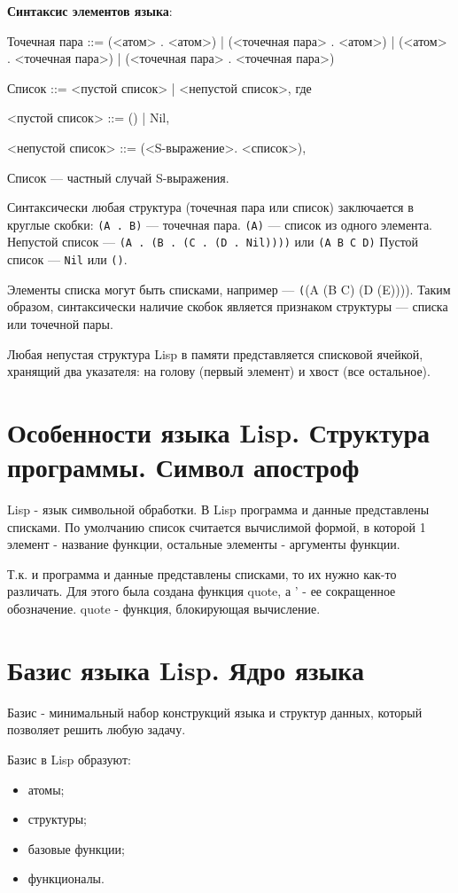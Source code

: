 \textbf{Синтаксис элементов языка}:
\vspace{5mm}


Точечная пара ::= (<атом> . <атом>) | (<точечная пара> . <атом>) | (<атом> . <точечная пара>) | (<точечная пара> . <точечная пара>)

Список ::= <пустой список> | <непустой список>, где 

<пустой список> ::= () | Nil,

<непустой список> ::= (<S-выражение>. <список>),

\vspace{5mm}


Список --- частный случай S-выражения.

Синтаксически любая структура (точечная пара или список) заключается в круглые скобки:
\texttt{(A . B)} --- точечная пара.
\texttt{(A)} --- список из одного элемента.
Непустой список --- \texttt{(A . (B . (C . (D . Nil))))} или \texttt{(A B C D)}
Пустой список --- \texttt{Nil} или \texttt{()}.

Элементы списка могут быть списками, например --- \texttt((A (B C) (D (E)))). Таким образом, синтаксически наличие скобок является признаком структуры --- списка или точечной пары.

Любая непустая структура Lisp в памяти представляется  списковой ячейкой, хранящий два указателя: на голову (первый элемент) и хвост (все остальное).

\section*{Особенности языка Lisp. Структура программы. Символ апостроф}
Lisp - язык символьной обработки. 
В Lisp программа и данные представлены списками.
По умолчанию список считается вычислимой формой, в которой 1 элемент - название функции, остальные элементы - аргументы функции.

Т.к. и программа и данные представлены списками, то их нужно как-то различать. 
Для этого была создана функция quote, а ' - ее сокращенное обозначение. 
quote - функция, блокирующая вычисление.


\section*{Базис языка Lisp. Ядро языка}
Базис - минимальный набор конструкций языка и структур данных, который позволяет решить любую задачу.

Базис в Lisp образуют:
\begin{itemize}
	\item атомы;
	\item структуры;
	\item базовые функции;
	\item функционалы.
\end{itemize}